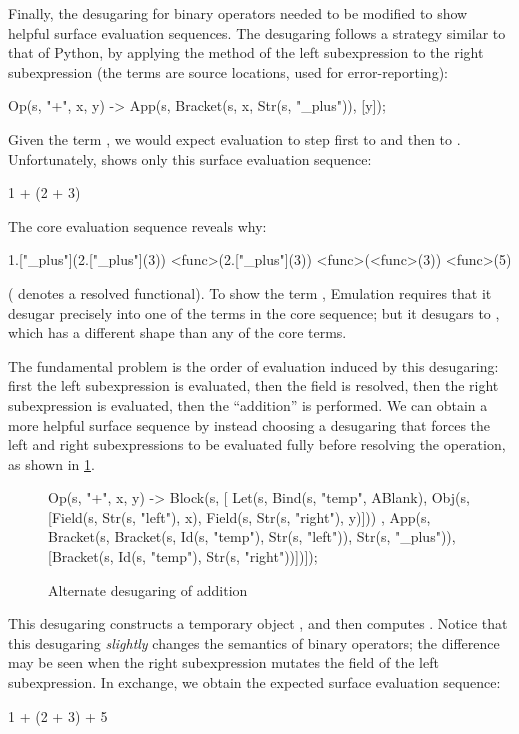 Finally, the desugaring for binary operators needed to be modified to show helpful
surface evaluation sequences. The desugaring follows
a strategy similar to that of Python, by applying the  method
of the left subexpression to the right subexpression (the  terms
are source locations, used for error-reporting):
\begin{Codes}
  Op(s, "+", x, y)  ->
    App(s, Bracket(s, x, Str(s, "_plus")), [y]);
\end{Codes}
Given the term , we would expect evaluation to step
first to  and then to . Unfortunately, {\Resugarer}
shows only this surface evaluation sequence:
\begin{Codes}
    1 + (2 + 3) 
\end{Codes}
The core evaluation sequence reveals why:
\begin{Codes}
    1.["_plus"](2.["_plus"](3))
\CoreStep <func>(2.["_plus"](3))
\CoreStep <func>(<func>(3))
\CoreStep <func>(5)
\end{Codes}
( denotes a resolved functional). To show the
term , Emulation requires that it desugar
precisely into one of the terms in the core sequence; but it desugars
to , which has a different shape than any of the
core terms.

The fundamental problem is the order of evaluation induced by this
desugaring: first the left subexpression is evaluated, then the
 field is resolved, then the right subexpression is
evaluated, then the ``addition'' is performed. We can obtain a more
helpful surface sequence by instead choosing a desugaring
that forces the left and right subexpressions to be evaluated fully before
resolving the operation, as shown in \cref{fig:reval-alt-plus}.

\begin{figure}[t]
\begin{Codes}
  Op(s, "+", x, y) ->
    Block(s,
    [ Let(s, Bind(s, "temp", ABlank),
             Obj(s, [Field(s, Str(s, "left"), x),
                     Field(s, Str(s, "right"), y)]))
    , App(s, Bracket(s, Bracket(s, Id(s, "temp"),
                                   Str(s, "left")),
                        Str(s, "_plus")),
             [Bracket(s, Id(s, "temp"),
                         Str(s, "right"))])]);
\end{Codes}
\caption{Alternate desugaring of addition}
\label{fig:reval-alt-plus}
\end{figure}
This desugaring constructs a temporary object , and then computes . Notice that
this desugaring \emph{slightly} changes the semantics of binary operators;
the difference may be seen when the right subexpression mutates the
 field of the left subexpression. In exchange, we obtain the
expected surface evaluation sequence:
\begin{Codes}
    1 + (2 + 3)  + 5 
\end{Codes}


